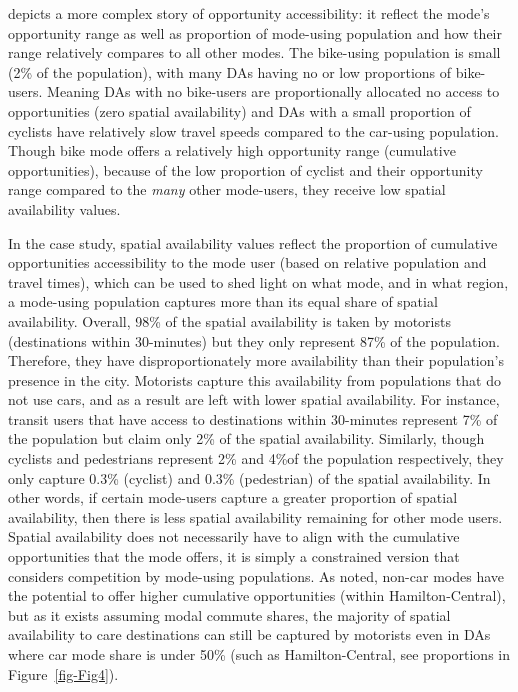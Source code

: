 \documentclass[
  authoryear,
  preprint,
  3p]{elsarticle}
\begin{document}
depicts a more complex story of opportunity accessibility: it reflect
the mode's opportunity range as well as proportion of mode-using
population and how their range relatively compares to all other modes.
The bike-using population is small (2\% of the population), with many
DAs having no or low proportions of bike-users. Meaning DAs with no
bike-users are proportionally allocated no access to opportunities (zero
spatial availability) and DAs with a small proportion of cyclists have
relatively slow travel speeds compared to the car-using population.
Though bike mode offers a relatively high opportunity range (cumulative
opportunities), because of the low proportion of cyclist and their
opportunity range compared to the \emph{many} other mode-users, they
receive low spatial availability values.

In the case study, spatial availability values reflect the proportion of
cumulative opportunities accessibility to the mode user (based on
relative population and travel times), which can be used to shed light
on what mode, and in what region, a mode-using population captures more
than its equal share of spatial availability. Overall, 98\% of the
spatial availability is taken by motorists (destinations within
30-minutes) but they only represent 87\% of the population. Therefore,
they have disproportionately more availability than their population's
presence in the city. Motorists capture this availability from
populations that do not use cars, and as a result are left with lower
spatial availability. For instance, transit users that have access to
destinations within 30-minutes represent 7\% of the population but claim
only 2\% of the spatial availability. Similarly, though cyclists and
pedestrians represent 2\% and 4\%of the population respectively, they
only capture 0.3\% (cyclist) and 0.3\% (pedestrian) of the spatial
availability. In other words, if certain mode-users capture a greater
proportion of spatial availability, then there is less spatial
availability remaining for other mode users. Spatial availability does
not necessarily have to align with the cumulative opportunities that the
mode offers, it is simply a constrained version that considers
competition by mode-using populations. As noted, non-car modes have the
potential to offer higher cumulative opportunities (within
Hamilton-Central), but as it exists assuming modal commute shares, the
majority of spatial availability to care destinations can still be
captured by motorists even in DAs where car mode share is under 50\%
(such as Hamilton-Central, see proportions in Figure~\ref{fig-Fig4}).
\end{document}
